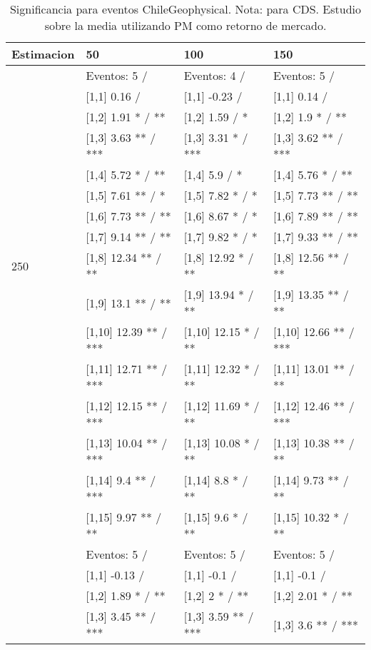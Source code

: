 \begin{table}

\caption{Significancia para eventos ChileGeophysical. Nota: para CDS. Estudio sobre la media utilizando PM como retorno de mercado.}
\centering
\begin{tabular}[t]{llll}
\toprule
Estimacion & 50 & 100 & 150\\
\midrule
 & Eventos:  5 / & Eventos:  4 / & Eventos:  5 /\\
 & {}[1,1] 0.16  / & {}[1,1] -0.23  / & {}[1,1] 0.14  /\\
 & {}[1,2] 1.91 * / ** & {}[1,2] 1.59  / * & {}[1,2] 1.9 * / **\\
 & {}[1,3] 3.63 ** / *** & {}[1,3] 3.31 * / *** & {}[1,3] 3.62 ** / ***\\
 & {}[1,4] 5.72 * / ** & {}[1,4] 5.9  / * & {}[1,4] 5.76 * / **\\
\addlinespace
 & {}[1,5] 7.61 ** / * & {}[1,5] 7.82 * / * & {}[1,5] 7.73 ** / **\\
 & {}[1,6] 7.73 ** / ** & {}[1,6] 8.67 * / * & {}[1,6] 7.89 ** / **\\
 & {}[1,7] 9.14 ** / ** & {}[1,7] 9.82 * / * & {}[1,7] 9.33 ** / **\\
250 & {}[1,8] 12.34 ** / ** & {}[1,8] 12.92 * / ** & {}[1,8] 12.56 ** / **\\
 & {}[1,9] 13.1 ** / ** & {}[1,9] 13.94 * / ** & {}[1,9] 13.35 ** / **\\
\addlinespace
 & {}[1,10] 12.39 ** / *** & {}[1,10] 12.15 * / ** & {}[1,10] 12.66 ** / ***\\
 & {}[1,11] 12.71 ** / *** & {}[1,11] 12.32 * / ** & {}[1,11] 13.01 ** / **\\
 & {}[1,12] 12.15 ** / *** & {}[1,12] 11.69 * / ** & {}[1,12] 12.46 ** / ***\\
 & {}[1,13] 10.04 ** / *** & {}[1,13] 10.08 * / ** & {}[1,13] 10.38 ** / **\\
 & {}[1,14] 9.4 ** / *** & {}[1,14] 8.8 * / ** & {}[1,14] 9.73 ** / **\\
\addlinespace
 & {}[1,15] 9.97 ** / ** & {}[1,15] 9.6 * / ** & {}[1,15] 10.32 * / **\\
 & Eventos:  5 / & Eventos:  5 / & Eventos:  5 /\\
 & {}[1,1] -0.13  / & {}[1,1] -0.1  / & {}[1,1] -0.1  /\\
 & {}[1,2] 1.89 * / ** & {}[1,2] 2 * / ** & {}[1,2] 2.01 * / **\\
 & {}[1,3] 3.45 ** / *** & {}[1,3] 3.59 ** / *** & {}[1,3] 3.6 ** / ***\\

\end{tabular}
\end{table}
